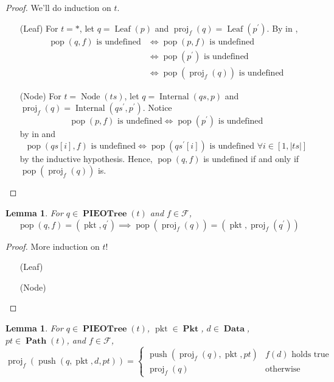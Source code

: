 \documentclass{amsart}
\DeclareMathOperator{\pkt}{\mathrm{pkt}}
\DeclareMathOperator{\push}{\mathrm{push}}
\DeclareMathOperator{\pop}{\mathrm{pop}}
\DeclareMathOperator{\proj}{\mathrm{proj}}
\DeclareMathOperator{\Pkt}{\mathbf{Pkt}}
\DeclareMathOperator{\Data}{\mathbf{Data}}
\DeclareMathOperator{\Path}{\mathbf{Path}}
\DeclareMathOperator{\PIEOTree}{\mathbf{PIEOTree}}
\DeclareMathOperator{\Leaf}{\mathrm{Leaf}}
\DeclareMathOperator{\Internal}{\mathrm{Internal}}
\DeclareMathOperator{\Node}{\mathrm{Node}}
\newtheorem{lem}[thm]{Lemma}
\theoremstyle{definition}
\begin{document}
\begin{proof}
    We'll do induction on $t$.
    \begin{itemize}
        \item[(Leaf)] For $t = \ast$, let $q = \Leaf(p)$ and $\proj_f(q) = \Leaf(p^\prime)$.
            By  in ,
            \begin{align*}
                \pop(q, f) \text{ is undefined} &\iff \pop(p, f) \text{ is undefined} \\
                                                &\iff \pop(p^\prime) \text{ is undefined} \\
                                                &\iff \pop(\proj_f(q)) \text{ is undefined}
            \end{align*}

        \item[(Node)] For $t = \Node(ts)$, let $q = \Internal(qs, p)$ and $\proj_f(q) = \Internal(qs^\prime, p^\prime)$.
            Notice 
            $$\pop(p, f) \text{ is undefined} \iff \pop(p^\prime) \text{ is undefined}$$
            by  in  and 
            $$\pop(qs[i], f) \text{ is undefined} \iff \pop(qs^\prime[i]) \text{ is undefined $\forall i \in [1, |ts|]$}$$
            by the inductive hypothesis.
            Hence, $\pop(q, f)$ is undefined if and only if $\pop(\proj_f(q))$ is.
    \end{itemize}
\end{proof}

\begin{lem}
    \label{lem:pop}
    For $q \in \PIEOTree(t)$ and $f \in \mathcal F$, 
    $$
        \pop(q, f) = (\pkt, q^\prime) \implies \pop(\proj_f(q)) = (\pkt, \proj_f(q^\prime))
    $$
\end{lem}

\begin{proof}
    More induction on $t$!
    \begin{itemize}
        \item[(Leaf)]
        \item[(Node)]
    \end{itemize}
\end{proof}

\begin{lem}
    \label{lem:push}
    For $q \in \PIEOTree(t)$, $\pkt \in \Pkt$, $d \in \Data$, $pt \in \Path(t)$, and $f \in \mathcal F$,
    $$
        \proj_f(\push(q, \pkt, d, pt)) = 
        \begin{cases}
            \push(\proj_f(q), \pkt, pt) & f(d) \text{ holds true}\\
            \proj_f(q) & \text{otherwise}
        \end{cases}
    $$
\end{lem}
\end{document}
